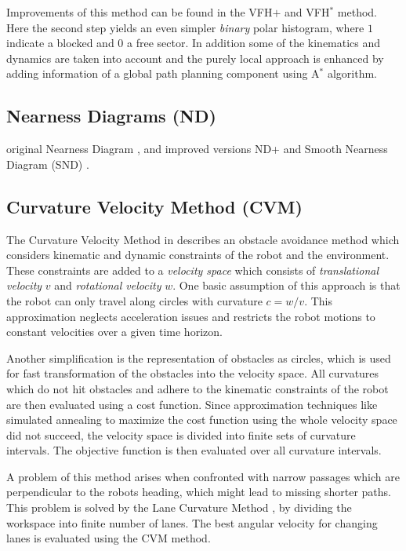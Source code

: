 Improvements of this method can be found in the VFH$+$ \cite{ulrich1998vfh+} and VFH$^*$ \cite{ulrich2000vfh} method. 
Here the second step yields an even simpler \emph{binary} polar histogram, where $1$ indicate a blocked and $0$ a free sector. 
In addition some of the kinematics and dynamics are taken into account and the purely local approach is enhanced by adding information of a global path planning component using A$^*$ algorithm. 

\subsection{Nearness Diagrams (ND)}
original Nearness Diagram \cite{minguez2004nearness}, and improved versions ND+ \cite{minguez2004divide} and Smooth Nearness Diagram (SND) \cite{durham2008smooth}.

\subsection{Curvature Velocity Method (CVM)}
The Curvature Velocity Method in \cite{simmons1996curvature} describes an obstacle avoidance method which considers kinematic and dynamic constraints of the robot and the environment.
These constraints are added to a \emph{velocity space} which consists of \emph{translational velocity} $v$ and \emph{rotational velocity} $w$.
One basic assumption of this approach is that the robot can only travel along circles with curvature $c=w/v$. 
This approximation neglects acceleration issues and restricts the robot motions to constant velocities over a given time horizon. 
  
Another simplification is the representation of obstacles as circles, which is used for fast transformation of the obstacles into the velocity space.
All curvatures which do not hit obstacles and adhere to the kinematic constraints of the robot are then evaluated using a cost function.
Since approximation techniques like simulated annealing to maximize the cost function using the whole velocity space did not succeed, the velocity space is divided into finite sets of curvature intervals.
The objective function is then evaluated over all curvature intervals.

A problem of this method arises when confronted with narrow passages which are perpendicular to the robots heading, which might lead to missing shorter paths. 
This problem is solved by the Lane Curvature Method \cite{ko1998lane}, by
dividing the workspace into finite number of lanes. 
The best angular velocity for changing lanes is evaluated using the CVM method. 

